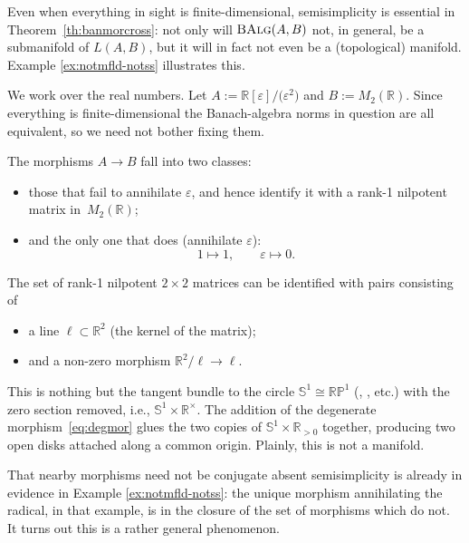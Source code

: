 \documentclass[10pt,a4paper]{amsart}
\numberwithin{equation}{section}
\newcommand\bP{{\mathbb P}}
\newcommand\bR{{\mathbb R}}
\newcommand\bS{{\mathbb S}}
\newcommand{\cat}[1]{\text{\sc #1}}
\begin{document}
Even when everything in sight is finite-dimensional, semisimplicity is essential in Theorem~\ref{th:banmorcross}: not only will $\cat{BAlg}(A,B)$ not, in general, be a submanifold of $L(A,B)$, but it will in fact not even be a (topological) manifold. Example \ref{ex:notmfld-notss} illustrates this.

\begin{Example}\label{ex:notmfld-notss}
 We work over the real numbers. Let $A:=\bR[\varepsilon]/\big(\varepsilon^2\big)$ and $B:=M_2(\bR)$. Since everything is finite-dimensional the Banach-algebra norms in question are all equivalent, so we need not bother fixing them.

 The morphisms $A\to B$ fall into two classes:
 \begin{itemize}\itemsep=0pt
 \item those that fail to annihilate $\varepsilon$, and hence identify it with a rank-1 nilpotent matrix in~$M_2(\bR)$;
 \item and the only one that does (annihilate $\varepsilon$):
 \begin{equation}\label{eq:degmor}
 1\mapsto 1,\qquad \varepsilon\mapsto 0.
 \end{equation}
 \end{itemize}
 The set of rank-1 nilpotent $2\times 2$ matrices can be identified with pairs consisting of
 \begin{itemize}\itemsep=0pt
 \item a line $\ell\subset \bR^2$ (the kernel of the matrix);
 \item and a non-zero morphism $\bR^2/\ell\to \ell$.
 \end{itemize}
 This is nothing but the tangent bundle to the circle $\bS^1\!\cong\! \bR\bP^1$ (\cite[Theorem 3.5]{3264}, \cite[Lemma~4.4]{ms-charclass}, etc.) with the zero section removed, i.e., $\bS^1\!\times \bR^{\times}$. The addition of the degenerate morphism~\eqref{eq:degmor} glues the two copies of $\bS^1\times \bR_{>0}$ together, producing two open disks attached along a common origin. Plainly, this is not a manifold.
\end{Example}

That nearby morphisms need not be conjugate absent semisimplicity is already in evidence in Example \ref{ex:notmfld-notss}: the unique morphism annihilating the radical, in that example, is in the closure of the set of morphisms which do not. It turns out this is a rather general phenomenon.
\end{document}
